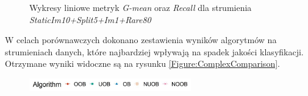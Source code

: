\begin{figure}[h]
    \centering
    \qquad
    \caption{Wykresy liniowe metryk \textit{G-mean} oraz \textit{Recall} dla strumienia \textit{StaticIm10+Split5+Im1+Rare80}}\label{Figure:ComlexScenario}
\end{figure}

\noindent W celach porównawczych dokonano zestawienia wyników algorytmów na strumieniach danych, które najbardziej wpływają na spadek jakości klasyfikacji. Otrzymane wyniki widoczne są na rysunku \ref{Figure:ComplexComparison}.

\begin{figure}[h]
    \centering
    \includegraphics[width=7cm]{figures/algorithms_legend.JPG}
\end{figure}

\vspace{-1.2cm}

